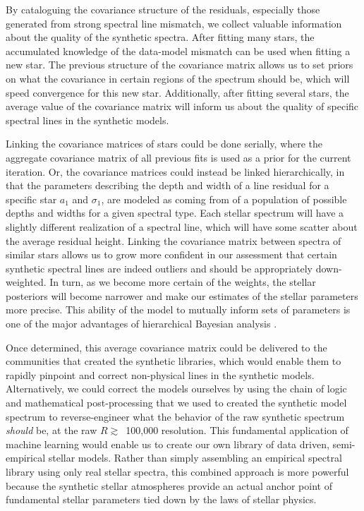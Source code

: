 \documentclass[iop,floatfix]{emulateapj}
\begin{document}
By cataloguing the covariance structure of the residuals, especially those generated from strong spectral line mismatch, we collect valuable information about the quality of the synthetic spectra. After fitting many stars, the accumulated knowledge of the data-model mismatch can be used when fitting a new star. The previous structure of the covariance matrix allows us to set priors on what the covariance in certain regions of the spectrum should be, which will speed convergence for this new star. Additionally, after fitting several stars, the average value of the covariance matrix will inform us about the quality of specific spectral lines in the synthetic models. 

Linking the covariance matrices of stars could be done serially, where the aggregate covariance matrix of all previous fits is used as a prior for the current iteration. Or, the covariance matrices could instead be linked hierarchically, in that the parameters describing the depth and width of a line residual for a specific star $a_1$ and $\sigma_1$, are modeled as coming from of a population of possible depths and widths for a given spectral type. Each stellar spectrum will have a slightly different realization of a spectral line, which will have some scatter about the average residual height. Linking the covariance matrix between spectra of similar stars allows us to grow more confident in our assessment that certain synthetic spectral lines are indeed outliers and should be appropriately down-weighted. In turn, as we become more certain of the weights, the stellar posteriors will become narrower and make our estimates of the stellar parameters more precise. This ability of the model to mutually inform sets of parameters is one of the major advantages of hierarchical Bayesian analysis \citep{kruschke10}.

Once determined, this average covariance matrix could be delivered to the communities that created the synthetic libraries, which would enable them to rapidly pinpoint and correct non-physical lines in the synthetic models. Alternatively, we could correct the models ourselves by using the chain of logic and mathematical post-processing that we used to created the synthetic model spectrum to reverse-engineer what the behavior of the raw synthetic spectrum \emph{should} be, at the raw $R \gtrsim$~100,000 resolution. This fundamental application of machine learning would enable us to create our own library of data driven, semi-empirical stellar models. Rather than simply assembling an empirical spectral library using only real stellar spectra, this combined approach is more powerful because the synthetic stellar atmospheres provide an actual anchor point of fundamental stellar parameters tied down by the laws of stellar physics.
\end{document}
